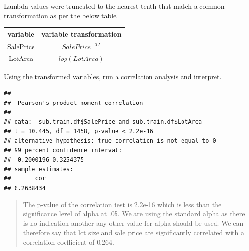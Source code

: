 \documentclass[]{article}
\newenvironment{Shaded}{\begin{snugshade}}{\end{snugshade}}
\newcommand{\KeywordTok}[1]{\textcolor[rgb]{0.13,0.29,0.53}{\textbf{{#1}}}}
\newcommand{\DataTypeTok}[1]{\textcolor[rgb]{0.13,0.29,0.53}{{#1}}}
\newcommand{\DecValTok}[1]{\textcolor[rgb]{0.00,0.00,0.81}{{#1}}}
\newcommand{\StringTok}[1]{\textcolor[rgb]{0.31,0.60,0.02}{{#1}}}
\newcommand{\NormalTok}[1]{{#1}}
\begin{document}
\justifying

Lambda values were truncated to the nearest tenth that match a common
transformation as per the below table.

\centering

\begin{tabular}{ c c }
\hline
variable & variable transformation \\ \hline
SalePrice & $SalePrice^{-0.5}$ \\
LotArea & $log(LotArea)$ 
\end{tabular}

\justifying

\setlength{\tabcolsep}{6pt}

Using the transformed variables, run a correlation analysis and
interpret.

\begin{Shaded}
\end{Shaded}

\begin{verbatim}
## 
##  Pearson's product-moment correlation
## 
## data:  sub.train.df$SalePrice and sub.train.df$LotArea
## t = 10.445, df = 1458, p-value < 2.2e-16
## alternative hypothesis: true correlation is not equal to 0
## 99 percent confidence interval:
##  0.2000196 0.3254375
## sample estimates:
##       cor 
## 0.2638434
\end{verbatim}

\begin{quote}
The p-value of the correlation test is 2.2e-16 which is less than the
significance level of alpha at .05. We are using the standard alpha as
there is no indication another any other value for alpha should be used.
We can therefore say that lot size and sale price are significantly
correlated with a correlation coefficient of 0.264.
\end{quote}
\end{document}
